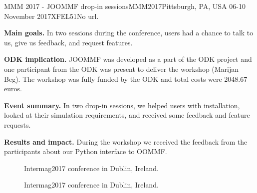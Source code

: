 \begin{event}{MMM 2017 - JOOMMF drop-in sessions}{MMM2017}{Pittsburgh, PA, USA 06-10 November 2017}{XFEL}{5}{1}{No url.}

\textbf{Main goals.} In two sessions during the conference, users had a chance to talk to us, give us feedback, and request features.

\textbf{ODK implication.} JOOMMF was developed as a part of the ODK project and one participant from the ODK was present to deliver the workshop (Marijan Beg). The workshop was fully funded by the ODK and total costs were 2048.67 euros.

\textbf{Event summary.} In two drop-in sessions, we helped users with installation, looked at their simulation requirements, and received some feedback and feature requests.

\textbf{Results and impact.} During the workshop we received the feedback from the participants about our Python interface to OOMMF.

\begin{figure}[ht]

\caption*{Intermag2017 conference in Dublin, Ireland.}
\end{figure}

\begin{figure}[ht]

\caption*{Intermag2017 conference in Dublin, Ireland.}
\end{figure}

\end{event}
